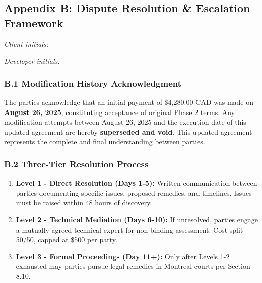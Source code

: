 \documentclass[11pt, a4paper]{article}
\begin{document}
\subsection*{Appendix B: Dispute Resolution \& Escalation Framework}
\label{appendix:dispute}
\noindent
\begin{minipage}[t]{0.45\textwidth}
\textit{Client initials: }\TextField[name=init_client_B,width=1.6cm,bordercolor={0.7 0.7 0.7}]{}
\end{minipage}%
\hfill%
\begin{minipage}[t]{0.45\textwidth}
\raggedleft
\textit{Developer initials: }\TextField[name=init_dev_B,width=1.6cm,bordercolor={0.7 0.7 0.7}]{}
\end{minipage}
\vspace{0.3cm}

\subsubsection*{B.1 Modification History Acknowledgment}
The parties acknowledge that an initial payment of \$4,280.00 CAD was made on \textbf{August 26, 2025}, constituting acceptance of original Phase 2 terms. Any modification attempts between August 26, 2025 and the execution date of this updated agreement are hereby \textbf{superseded and void}. This updated agreement represents the complete and final understanding between parties.

\subsubsection*{B.2 Three-Tier Resolution Process}
\begin{enumerate}
\item \textbf{Level 1 - Direct Resolution (Days 1-5):} Written communication between parties documenting specific issues, proposed remedies, and timelines. Issues must be raised within 48 hours of discovery.

\item \textbf{Level 2 - Technical Mediation (Days 6-10):} If unresolved, parties engage a mutually agreed technical expert for non-binding assessment. Cost split 50/50, capped at \$500 per party.

\item \textbf{Level 3 - Formal Proceedings (Day 11+):} Only after Levels 1-2 exhausted may parties pursue legal remedies in Montreal courts per Section 8.10.
\end{enumerate}
\end{document}
